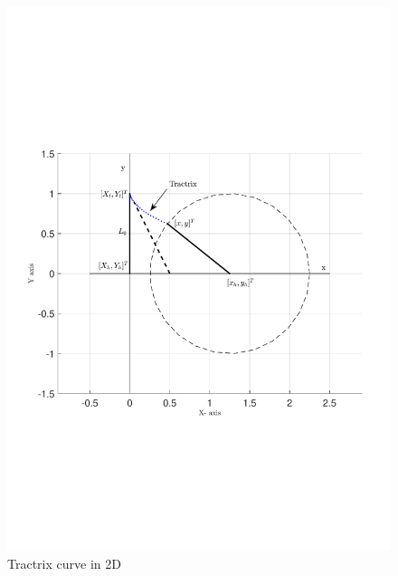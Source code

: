 \documentclass[11pt,a4paper]{article}
\begin{document}
\begin{figure}[h]
\centering
\includegraphics[scale=0.75]{figures/fig1.pdf}
\caption{Tractrix curve in 2D\label{fig1}}
\end{figure}
\end{document}
